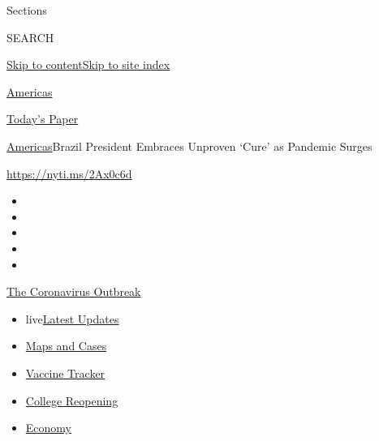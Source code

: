 Sections

SEARCH

\protect\hyperlink{site-content}{Skip to
content}\protect\hyperlink{site-index}{Skip to site index}

\href{https://www.nytimes.com/section/world/americas}{Americas}

\href{https://myaccount.nytimes.com/auth/login?response_type=cookie\&client_id=vi}{}

\href{https://www.nytimes.com/section/todayspaper}{Today's Paper}

\href{/section/world/americas}{Americas}\textbar{}Brazil President
Embraces Unproven `Cure' as Pandemic Surges

\url{https://nyti.ms/2Ax0c6d}

\begin{itemize}
\item
\item
\item
\item
\item
\end{itemize}

\href{https://www.nytimes.com/news-event/coronavirus?action=click\&pgtype=Article\&state=default\&region=TOP_BANNER\&context=storylines_menu}{The
Coronavirus Outbreak}

\begin{itemize}
\tightlist
\item
  live\href{https://www.nytimes.com/2020/08/04/world/coronavirus-cases.html?action=click\&pgtype=Article\&state=default\&region=TOP_BANNER\&context=storylines_menu}{Latest
  Updates}
\item
  \href{https://www.nytimes.com/interactive/2020/us/coronavirus-us-cases.html?action=click\&pgtype=Article\&state=default\&region=TOP_BANNER\&context=storylines_menu}{Maps
  and Cases}
\item
  \href{https://www.nytimes.com/interactive/2020/science/coronavirus-vaccine-tracker.html?action=click\&pgtype=Article\&state=default\&region=TOP_BANNER\&context=storylines_menu}{Vaccine
  Tracker}
\item
  \href{https://www.nytimes.com/2020/08/02/us/covid-college-reopening.html?action=click\&pgtype=Article\&state=default\&region=TOP_BANNER\&context=storylines_menu}{College
  Reopening}
\item
  \href{https://www.nytimes.com/live/2020/08/04/business/stock-market-today-coronavirus?action=click\&pgtype=Article\&state=default\&region=TOP_BANNER\&context=storylines_menu}{Economy}
\end{itemize}

